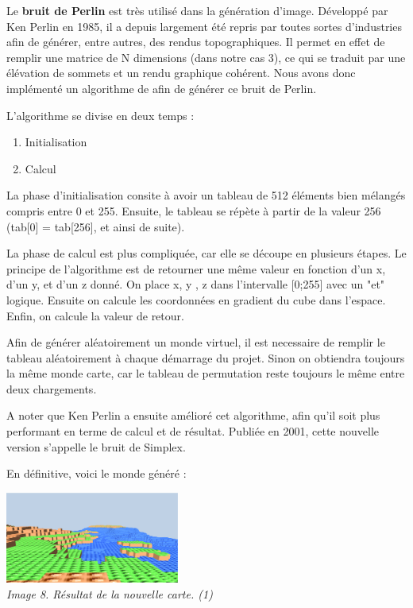 ﻿
Le \textbf{bruit de Perlin} est très utilisé dans la génération d'image. Développé par Ken Perlin en 1985, il a depuis largement été repris par toutes sortes d'industries afin de générer, entre autres, des rendus topographiques.	Il permet en effet de remplir une matrice de N dimensions (dans notre cas 3), ce qui se traduit par une élévation de sommets et un rendu graphique cohérent. Nous avons donc implémenté un algorithme de afin de générer ce bruit de Perlin. 

L'algorithme se divise en deux temps :

\begin{enumerate}
	\item Initialisation
	\item Calcul
\end{enumerate}

La phase d'initialisation consite à avoir un tableau de 512 éléments bien mélangés compris entre 0 et 255. Ensuite, le tableau se répète à partir de la valeur 256 (tab[0] = tab[256], et ainsi de suite). 

La phase de calcul est plus compliquée, car elle se découpe en plusieurs étapes. Le principe de l'algorithme est de retourner une même valeur en fonction d'un x, d'un y, et d'un z donné. On place x, y , z dans l'intervalle [0;255] avec un "et" logique. Ensuite on calcule les coordonnées en gradient du cube dans l'espace. Enfin, on calcule la valeur de retour. 

Afin de générer aléatoirement un monde virtuel, il est necessaire de remplir le tableau aléatoirement à chaque démarrage du projet. Sinon on obtiendra toujours la même monde carte, car le tableau de permutation reste toujours le même entre deux chargements.

A noter que Ken Perlin a ensuite amélioré cet algorithme, afin qu'il soit plus performant en terme de calcul et de résultat. Publiée en 2001, cette nouvelle version s'appelle le bruit de Simplex.

En définitive, voici le monde généré :

\begin{center}
	\null\vspace{0.25cm}
	\includegraphics[height=3cm]{images/newworld2.eps}\\
	\textit{Image 8. Résultat de la nouvelle carte. (1)}\\
\end{center}
